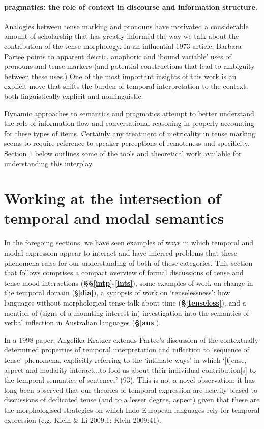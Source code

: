 \documentclass[12pt]{article}
\begin{document}
\paragraph{pragmatics: the role of context in discourse and information structure.}

Analogies between tense marking and pronouns have motivated a considerable amount of scholarship that has greatly informed the way we talk about the contribution of the tense morphology. In an influential 1973 article, Barbara Partee points to apparent deictic, anaphoric and `bound variable' uses of pronouns and tense markers (and potential constructions that lead to ambiguity between these uses.)   One of the most important insights of this work is an explicit move that shifts the burden of temporal interpretation to the context, both linguistically explicit and nonlinguistic.

Dynamic approaches to semantics and pragmatics attempt to better understand the role of information flow and conversational reasoning in properly accounting for these types of items. Certainly any treatment of metricality in tense marking seems to require reference to speaker perceptions of remoteness and specificity. Section \ref{lit} below outlines some of the tools and theoretical work available for understanding this interplay.

\section{Working at the intersection of temporal and modal semantics}\label{lit}
In the foregoing sections, we have seen examples of ways in which temporal and modal expression appear to interact and have inferred problems that these phenomena raise for our understanding of both of these categories. This section that follows comprises a compact overview of formal discussions of tense and tense-mood interactions (\textbf{§§\ref{intp}-\ref{ints}}), some examples of work on change in the temporal domain (§\textbf{\ref{dia}}), a synopsis of work on `tenselessness': how languages without morphological tense talk about time (\textbf{§\ref{tenseless}}), and a mention of (signs of a mounting interest in) investigation into the semantics of verbal inflection in Australian languages (\textbf{§\ref{aus}}).


In a 1998 paper, Angelika Kratzer extends Partee's discussion of the contextually determined properties of temporal interpretation and inflection to `sequence of tense' phenomena, explicitly referring to the `intimate ways' in which `[t]ense, aspect and modality interact...to fool us about their individual contribution[s] to the temporal semantics of sentences' (93). This is not a novel observation; it has long been observed that our theories of temporal expression are heavily  biased to discussions of dedicated tense (and to a lesser degree, aspect) given that these are the morphologised strategies on which Indo-European languages rely for temporal expression (e.g. Klein \& Li 2009:1; Klein 2009:41).
\end{document}
